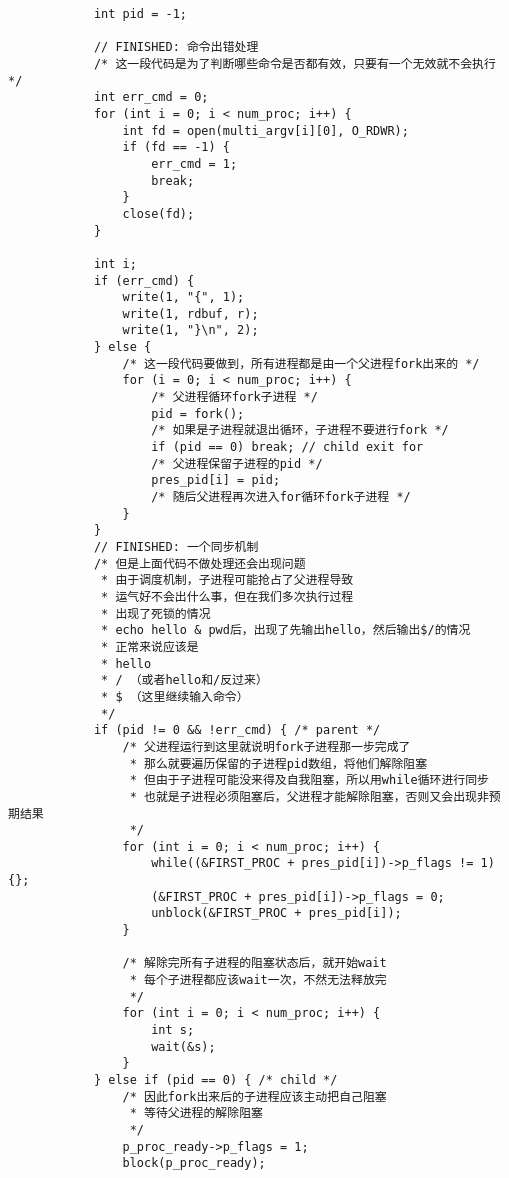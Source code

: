 \documentclass{whureport}
\begin{document}
\begin{lstlisting}
            int pid = -1;
            
			// FINISHED: 命令出错处理
			/* 这一段代码是为了判断哪些命令是否都有效，只要有一个无效就不会执行 */
            int err_cmd = 0;
            for (int i = 0; i < num_proc; i++) {
                int fd = open(multi_argv[i][0], O_RDWR);
                if (fd == -1) {
                    err_cmd = 1;
                    break;
                }
                close(fd);
            }

            int i;
            if (err_cmd) {
                write(1, "{", 1);
                write(1, rdbuf, r);
                write(1, "}\n", 2);
            } else {
            	/* 这一段代码要做到，所有进程都是由一个父进程fork出来的 */
                for (i = 0; i < num_proc; i++) {
                	/* 父进程循环fork子进程 */
                    pid = fork();
                    /* 如果是子进程就退出循环，子进程不要进行fork */
                    if (pid == 0) break; // child exit for
                    /* 父进程保留子进程的pid */
                    pres_pid[i] = pid;
                    /* 随后父进程再次进入for循环fork子进程 */
                }
            }
            // FINISHED: 一个同步机制
            /* 但是上面代码不做处理还会出现问题
             * 由于调度机制，子进程可能抢占了父进程导致
             * 运气好不会出什么事，但在我们多次执行过程
             * 出现了死锁的情况
             * echo hello & pwd后，出现了先输出hello，然后输出$/的情况
             * 正常来说应该是
             * hello
             * / （或者hello和/反过来）
             * $ （这里继续输入命令）
             */
            if (pid != 0 && !err_cmd) { /* parent */
            	/* 父进程运行到这里就说明fork子进程那一步完成了
            	 * 那么就要遍历保留的子进程pid数组，将他们解除阻塞
            	 * 但由于子进程可能没来得及自我阻塞，所以用while循环进行同步
            	 * 也就是子进程必须阻塞后，父进程才能解除阻塞，否则又会出现非预期结果
            	 */
                for (int i = 0; i < num_proc; i++) {
                	while((&FIRST_PROC + pres_pid[i])->p_flags != 1) {};
                    (&FIRST_PROC + pres_pid[i])->p_flags = 0;
                    unblock(&FIRST_PROC + pres_pid[i]);
                }
                
                /* 解除完所有子进程的阻塞状态后，就开始wait
                 * 每个子进程都应该wait一次，不然无法释放完
                 */
                for (int i = 0; i < num_proc; i++) {
                    int s;
                    wait(&s);
                }
            } else if (pid == 0) { /* child */
            	/* 因此fork出来后的子进程应该主动把自己阻塞
            	 * 等待父进程的解除阻塞
            	 */
                p_proc_ready->p_flags = 1;
                block(p_proc_ready);


\end{lstlisting}
\end{document}
